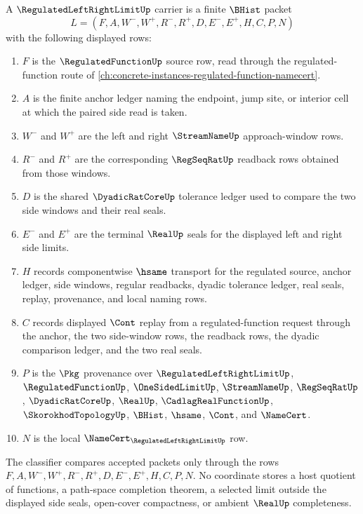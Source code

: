 \begin{definition}
\label{def:regulated-left-right-limit-carrier}
A $\RegulatedLeftRightLimitUp$ carrier is a finite $\BHist$ packet
$$
L=(F,A,W^-,W^+,R^-,R^+,D,E^-,E^+,H,C,P,N)
$$
with the following displayed rows:
\begin{enumerate}
\item $F$ is the $\RegulatedFunctionUp$ source row, read through the regulated-function route of \autoref{ch:concrete-instances-regulated-function-namecert}.
\item $A$ is the finite anchor ledger naming the endpoint, jump site, or interior cell at which the paired side read is taken.
\item $W^-$ and $W^+$ are the left and right $\StreamNameUp$ approach-window rows.
\item $R^-$ and $R^+$ are the corresponding $\RegSeqRatUp$ readback rows obtained from those windows.
\item $D$ is the shared $\DyadicRatCoreUp$ tolerance ledger used to compare the two side windows and their real seals.
\item $E^-$ and $E^+$ are the terminal $\RealUp$ seals for the displayed left and right side limits.
\item $H$ records componentwise $\hsame$ transport for the regulated source, anchor ledger, side windows, regular readbacks, dyadic tolerance ledger, real seals, replay, provenance, and local naming rows.
\item $C$ records displayed $\Cont$ replay from a regulated-function request through the anchor, the two side-window rows, the readback rows, the dyadic comparison ledger, and the two real seals.
\item $P$ is the $\Pkg$ provenance over $\RegulatedLeftRightLimitUp$, $\RegulatedFunctionUp$, $\OneSidedLimitUp$, $\StreamNameUp$, $\RegSeqRatUp$, $\DyadicRatCoreUp$, $\RealUp$, $\CadlagRealFunctionUp$, $\SkorokhodTopologyUp$, $\BHist$, $\hsame$, $\Cont$, and $\NameCert$.
\item $N$ is the local $\NameCert_{\RegulatedLeftRightLimitUp}$ row.
\end{enumerate}
The classifier compares accepted packets only through the rows $F,A,W^-,W^+,R^-,R^+,D,E^-,E^+,H,C,P,N$. No coordinate stores a host quotient of functions, a path-space completion theorem, a selected limit outside the displayed side seals, open-cover compactness, or ambient $\RealUp$ completeness.
\end{definition}

